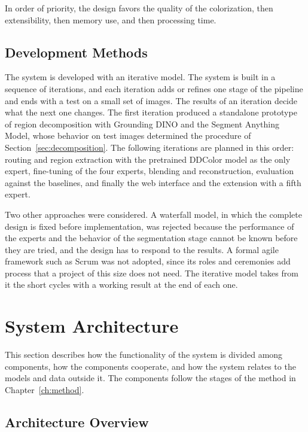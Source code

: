 \documentclass{FastFyp}
\begin{document}
In order of priority, the design favors the quality of the colorization, then extensibility, then memory use, and then processing time.


\subsection{Development Methods}

The system is developed with an iterative model. The system is built in a sequence of iterations, and each iteration adds or refines one stage of the pipeline and ends with a test on a small set of images. The results of an iteration decide what the next one changes. The first iteration produced a standalone prototype of region decomposition with Grounding DINO and the Segment Anything Model, whose behavior on test images determined the procedure of Section~\ref{sec:decomposition}. The following iterations are planned in this order: routing and region extraction with the pretrained DDColor model as the only expert, fine-tuning of the four experts, blending and reconstruction, evaluation against the baselines, and finally the web interface and the extension with a fifth expert.

Two other approaches were considered. A waterfall model, in which the complete design is fixed before implementation, was rejected because the performance of the experts and the behavior of the segmentation stage cannot be known before they are tried, and the design has to respond to the results. A formal agile framework such as Scrum was not adopted, since its roles and ceremonies add process that a project of this size does not need. The iterative model takes from it the short cycles with a working result at the end of each one.


\section{System Architecture}
\label{sec:architecture}

This section describes how the functionality of the system is divided among components, how the components cooperate, and how the system relates to the models and data outside it. The components follow the stages of the method in Chapter~\ref{ch:method}.

\subsection{Architecture Overview}
\end{document}
